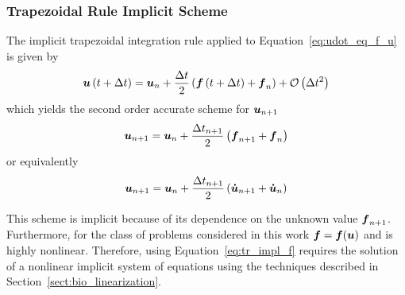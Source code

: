 \subsubsection*{Trapezoidal Rule Implicit Scheme}
The implicit trapezoidal integration rule applied to Equation~\eqref{eq:udot_eq_f_u} is given by
\begin{equation}
  \label{eq:tr_impl_cont}
  {\boldsymbol{u}}\left(t+\Delta t\right) = {\boldsymbol{u}}_n + \frac{\Delta t}{2}\left({\boldsymbol{f}}\left(t+\Delta t\right) + {\boldsymbol{f}}_n\right)
  + \mathcal{O}\left(\Delta t^2\right)
\end{equation}
which yields the second order accurate scheme for ${\boldsymbol{u}}_{n+1}$
\begin{equation}
  \label{eq:tr_impl_f}
  {\boldsymbol{u}}_{n+1} = {\boldsymbol{u}}_n + \frac{\Delta t_{n+1}}{2}\left({\boldsymbol{f}}_{n+1} + {\boldsymbol{f}}_n\right)
\end{equation}
or equivalently
\begin{equation}
  \label{eq:tr_impl_u}
  {\boldsymbol{u}}_{n+1} = {\boldsymbol{u}}_n + \frac{\Delta t_{n+1}}{2}\left({\boldsymbol{\dot{u}}}_{n+1} + {\boldsymbol{\dot{u}}}_n\right)
\end{equation}

This scheme is implicit because of its dependence on the unknown value ${\boldsymbol{f}}_{n+1}$.  Furthermore, for the class of problems considered in this work ${\boldsymbol{f}}={\boldsymbol{f}}({\boldsymbol{u}})$ and is highly nonlinear.  Therefore, using Equation~\eqref{eq:tr_impl_f} requires the solution of a nonlinear implicit system of equations using the techniques described in Section~\ref{sect:bio_linearization}.

